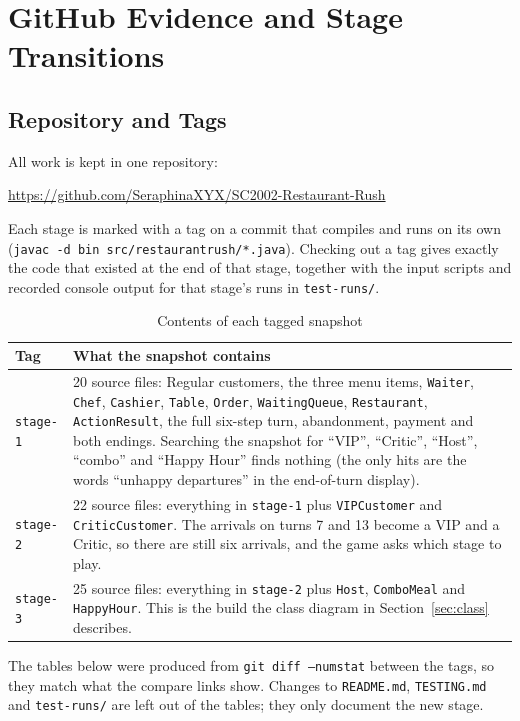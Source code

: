 \section{GitHub Evidence and Stage Transitions}

\subsection{Repository and Tags}

All work is kept in one repository:
\begin{center}\url{https://github.com/SeraphinaXYX/SC2002-Restaurant-Rush}\end{center}
Each stage is marked with a tag on a commit that compiles and runs on its own
(\texttt{javac -d bin src/restaurantrush/*.java}). Checking out a tag gives exactly the
code that existed at the end of that stage, together with the input scripts and recorded
console output for that stage's runs in \texttt{test-runs/}.

\begin{table}[H]
\centering
\begin{tabularx}{\textwidth}{lX}
\toprule
\textbf{Tag} & \textbf{What the snapshot contains} \\
\midrule
\texttt{stage-1} & 20 source files: Regular customers, the three menu items, \texttt{Waiter}, \texttt{Chef}, \texttt{Cashier},
\texttt{Table}, \texttt{Order}, \texttt{WaitingQueue}, \texttt{Restaurant}, \texttt{ActionResult}, the full six-step turn,
abandonment, payment and both endings. Searching the snapshot for ``VIP'', ``Critic'', ``Host'', ``combo'' and
``Happy Hour'' finds nothing (the only hits are the words ``unhappy departures'' in the end-of-turn display). \\
\texttt{stage-2} & 22 source files: everything in \texttt{stage-1} plus \texttt{VIPCustomer} and \texttt{CriticCustomer}.
The arrivals on turns 7 and 13 become a VIP and a Critic, so there are still six arrivals, and the game asks which stage to play. \\
\texttt{stage-3} & 25 source files: everything in \texttt{stage-2} plus \texttt{Host}, \texttt{ComboMeal} and \texttt{HappyHour}.
This is the build the class diagram in Section~\ref{sec:class} describes. \\
\bottomrule
\end{tabularx}
\caption{Contents of each tagged snapshot}
\end{table}

The tables below were produced from \texttt{git diff --numstat} between the tags, so they match what the
compare links show. Changes to \texttt{README.md}, \texttt{TESTING.md} and \texttt{test-runs/} are left out
of the tables; they only document the new stage.


